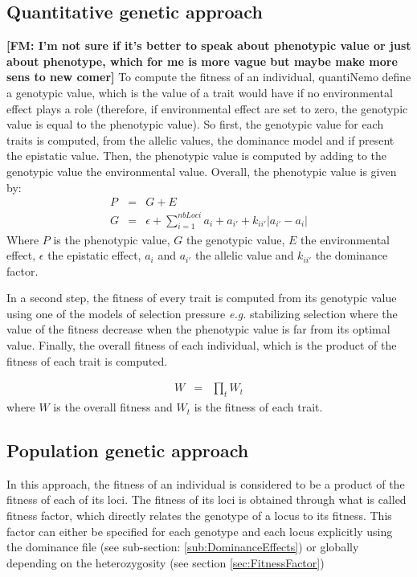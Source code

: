 \documentclass[letterpaper,12pt,oneside]{book}
\newcommand{\fm}[1]{\small {\bf \color{blue} [FM:  #1]} \normalsize}
\begin{document}
\subsection{Quantitative genetic approach}
\fm{I'm not sure if it's better to speak about phenotypic value or just about phenotype, which for me is more vague but maybe make more sens to new comer}
To compute the fitness of an individual, quantiNemo define a genotypic value, which is the value of a trait would have if no environmental effect plays a role (therefore, if environmental effect are set to zero, the genotypic value is equal to the phenotypic value). So first, the genotypic value for each traits is computed, from the allelic values, the dominance model and if present the epistatic value. Then, the phenotypic value is computed by adding to the genotypic value the environmental value. Overall, the phenotypic value is given by:
\begin{eqnarray}
P &=& G + E \\
G&=&\epsilon+\sum_{i=1}^{nbLoci}a_i+a_{i'}+k_{ii'}|a_{i'}-a_i| 
\end{eqnarray}
Where $P$ is the phenotypic value, $G$ the genotypic value, $E$ the environmental effect, $\epsilon$ the epistatic effect, $a_i$ and $a_{i'}$ the allelic value and $k_{ii'}$ the dominance factor. 

In a second step, the fitness of every trait is computed from its genotypic value using one of the models of selection pressure \textit{e.g.} stabilizing selection where the value of the fitness decrease when the phenotypic value is far from its optimal value. Finally, the overall fitness of each individual, which is the product of the fitness of each trait is computed.

\begin{eqnarray}
W &=& \prod_t W_t
\end{eqnarray}
where $W$ is the overall fitness and $W_t$ is the fitness of each trait. 
\subsection{Population genetic approach}
In this approach, the fitness of an individual is considered to be a product of the fitness of each of its loci. The fitness of its loci is obtained through what is called fitness factor, which directly relates the genotype of a locus to its fitness. This factor can either be specified for each genotype and each locus explicitly using the dominance file (see sub-section: \ref{sub:DominanceEffects}) or globally depending on the heterozygosity (see section \ref{sec:FitnessFactor})
\end{document}
